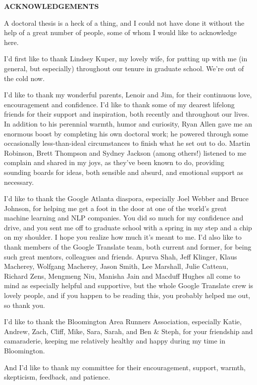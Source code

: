 
\begin{centering}
\textbf{ACKNOWLEDGEMENTS}\\
\vspace{\baselineskip}
\end{centering}

A doctoral thesis is a heck of a thing, and I could not have done it without
the help of a great number of people, some of whom I would like to acknowledge
here.

I'd first like to thank Lindsey Kuper, my lovely wife, for putting up with me
(in general, but especially) throughout our tenure in graduate school. We're
out of the cold now.

I'd like to thank my wonderful parents, Lenoir and Jim, for their continuous
love, encouragement and confidence.
I'd like to thank some of my dearest lifelong friends for their support and
inspiration, both recently and throughout our lives.
In addition to his perennial warmth, humor and curiosity, Ryan Allen gave me an
enormous boost by completing his own doctoral work\cite{allen2017visions}; he
powered through some occasionally less-than-ideal circumstances to finish what
he set out to do. Martin Robinson, Brett Thompson and Sydney Jackson (among
others!) listened to me complain and shared in my joys, as they've been known
to do, providing sounding boards for ideas, both sensible and absurd, and
emotional support as necessary.

I'd like to thank the Google Atlanta diaspora, especially Joel Webber and Bruce
Johnson, for helping me get a foot in the door at one of the world's great
machine learning and NLP companies. You did so much for my confidence and
drive, and you sent me off to graduate school with a spring in my step and a
chip on my shoulder. I hope you realize how much it's meant to me. I'd also
like to thank members of the Google Translate team, both current and former,
for being such great mentors, colleagues and friends. Apurva Shah, Jeff
Klinger, Klaus Macherey, Wolfgang Macherey, Jason Smith, Lee Marshall, Julie
Catteau, Richard Zens, Mengmeng Niu, Manisha Jain and Macduff Hughes all come
to mind as especially helpful and supportive, but the whole Google Translate
crew is lovely people, and if you happen to be reading this, you probably
helped me out, so thank you.

I'd like to thank the Bloomington Area Runners Association, especially Katie,
Andrew, Zach, Cliff, Mike, Sara, Sarah, and Ben \& Steph, for your friendship
and camaraderie, keeping me relatively healthy and happy during my time in
Bloomington.

And I'd like to thank my committee for their encouragement, support, warmth,
skepticism, feedback, and patience.
